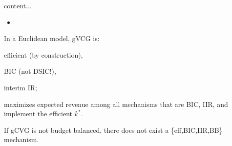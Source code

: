 \documentclass[english]{beamer}		%
\def\lyxframeend{} %
\begin{document}
\begin{theorem}
	content...
\end{theorem}
\begin{itemize}
	\item 
\end{itemize}
\lyxframeend


\lyxframeend


\begin{theorem}
	In a \alert{Euclidean} model, gVCG is:
	\begin{itemize}{\color{gray}
		\item efficient (by construction),
		\item BIC (not DSIC!),
		\item interim IR;}
		\item maximizes expected revenue among all mechanisms that are BIC, IIR, and implement the efficient $k^*$.
	\end{itemize}
\end{theorem}
If gCVG is not budget balanced, there does not exist a \{eff,BIC,IIR,BB\} mechanism.
\lyxframeend
\end{document}
